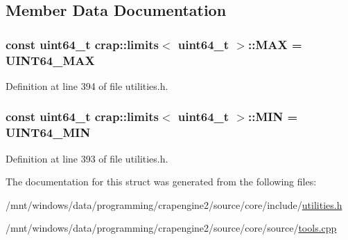 \subsection{Member Data Documentation}
\hypertarget{structcrap_1_1limits_3_01uint64__t_01_4_a7a37d0e7978b1adc854aad337e523a7b}{
\subsubsection[{M\+A\+X}]{\setlength{\rightskip}{0pt plus 5cm}const uint64\+\_\+t {\bf crap\+::limits}$<$ uint64\+\_\+t $>$\+::M\+A\+X = {\bf U\+I\+N\+T64\+\_\+\+M\+A\+X}\hspace{0.3cm}{\ttfamily [static]}}}\label{structcrap_1_1limits_3_01uint64__t_01_4_a7a37d0e7978b1adc854aad337e523a7b}


Definition at line 394 of file utilities.\+h.

\hypertarget{structcrap_1_1limits_3_01uint64__t_01_4_aad4a8fa4a712d5bc65a09835422df073}{
\subsubsection[{M\+I\+N}]{\setlength{\rightskip}{0pt plus 5cm}const uint64\+\_\+t {\bf crap\+::limits}$<$ uint64\+\_\+t $>$\+::M\+I\+N = {\bf U\+I\+N\+T64\+\_\+\+M\+I\+N}\hspace{0.3cm}{\ttfamily [static]}}}\label{structcrap_1_1limits_3_01uint64__t_01_4_aad4a8fa4a712d5bc65a09835422df073}


Definition at line 393 of file utilities.\+h.



The documentation for this struct was generated from the following files\+:\begin{DoxyCompactItemize}
\item 
/mnt/windows/data/programming/crapengine2/source/core/include/\hyperlink{utilities_8h}{utilities.\+h}\item 
/mnt/windows/data/programming/crapengine2/source/core/source/\hyperlink{tools_8cpp}{tools.\+cpp}\end{DoxyCompactItemize}
